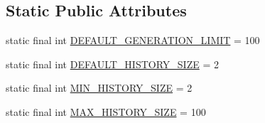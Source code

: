 \subsection*{Static Public Attributes}
\begin{DoxyCompactItemize}
\item 
static final int \hyperlink{classjenes_1_1_genetic_algorithm_3_01_t_01extends_01_chromosome_01_4_a2492ee1b00f5631a1c1b1c6f15ea3421}{D\-E\-F\-A\-U\-L\-T\-\_\-\-G\-E\-N\-E\-R\-A\-T\-I\-O\-N\-\_\-\-L\-I\-M\-I\-T} = 100
\item 
static final int \hyperlink{classjenes_1_1_genetic_algorithm_3_01_t_01extends_01_chromosome_01_4_a23df2e338c3439d7457ff6a150c573e1}{D\-E\-F\-A\-U\-L\-T\-\_\-\-H\-I\-S\-T\-O\-R\-Y\-\_\-\-S\-I\-Z\-E} = 2
\item 
static final int \hyperlink{classjenes_1_1_genetic_algorithm_3_01_t_01extends_01_chromosome_01_4_aa64b297086826bfbda1fbaccebe4cb24}{M\-I\-N\-\_\-\-H\-I\-S\-T\-O\-R\-Y\-\_\-\-S\-I\-Z\-E} = 2
\item 
static final int \hyperlink{classjenes_1_1_genetic_algorithm_3_01_t_01extends_01_chromosome_01_4_acd26085cf69c68d607ef08d0bf829224}{M\-A\-X\-\_\-\-H\-I\-S\-T\-O\-R\-Y\-\_\-\-S\-I\-Z\-E} = 100
\end{DoxyCompactItemize}
